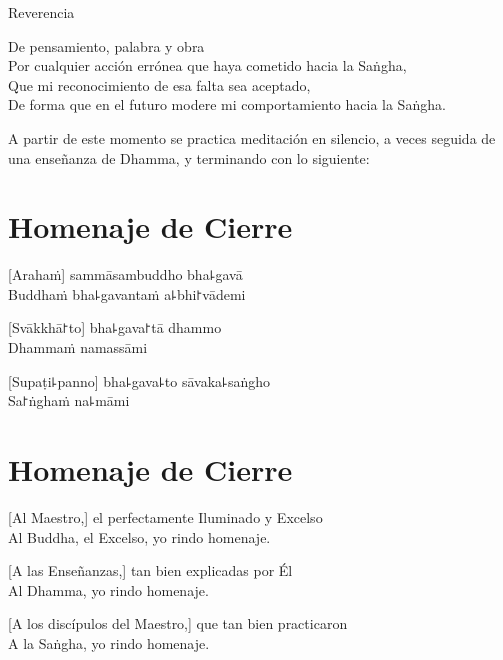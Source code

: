 \enlargethispage{2\baselineskip}

\begin{instruction}
  Reverencia
\end{instruction}

De pensamiento, palabra y obra\\
Por cualquier acción errónea que haya cometido hacia la Saṅgha,\\
Que mi reconocimiento de esa falta sea aceptado,\\
De forma que en el futuro modere mi comportamiento hacia la Saṅgha.

\begin{instruction}
  A partir de este momento se practica meditación en silencio, a veces seguida de una enseñanza de Dhamma, y terminando con lo siguiente:
\end{instruction}

\clearpage

\chapter*{Homenaje de Cierre}

\delegateSetUseNext

[Arahaṁ] sammāsambuddho bha꜕gavā\\
Buddhaṁ bha꜕gavantaṁ a꜕bhi꜓vādemi 

[Svākkhā꜓to] bha꜕gava꜓tā dhammo\\
Dhammaṁ namassāmi 

[Supaṭi꜕panno] bha꜕gava꜕to sāvaka꜕saṅgho\\
Sa꜓ṅghaṁ na꜕māmi 

\clearpage

\chapter{Homenaje de Cierre}

[Al Maestro,] el perfectamente Iluminado y Excelso \\
Al Buddha, el Excelso, yo rindo homenaje. 

[A las Enseñanzas,] tan bien explicadas por Él \\
Al Dhamma, yo rindo homenaje. 

[A los discípulos del Maestro,] que tan bien practicaron \\
A la Saṅgha, yo rindo homenaje. 
